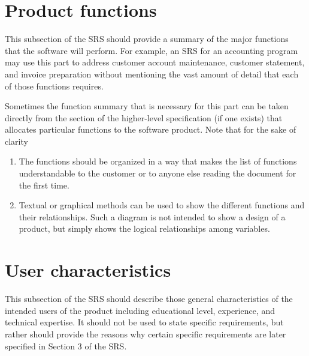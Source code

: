 \documentclass{scrreprt}
\begin{document}
\section{Product functions}
This subsection of the SRS should provide a summary of the major functions that
the software will perform. For example, an SRS for an accounting program may use
this part to address customer account maintenance, customer statement, and
invoice preparation without mentioning the vast amount of detail that each of
those functions requires.\par

Sometimes the function summary that is necessary for this part can be taken
directly from the section of the higher-level specification (if one exists) that
allocates particular functions to the software product. Note that for the sake
of clarity
\begin{enumerate}
	\item The functions should be organized in a way that makes the list of
		functions understandable to the customer or to anyone else reading the
		document for the first time.
	\item Textual or graphical methods can be used to show the different
		functions and their relationships. Such a diagram is not intended to
		show a design of a product, but simply shows the logical relationships
		among variables.
\end{enumerate}

\section{User characteristics}
This subsection of the SRS should describe those general characteristics of the
intended users of the product including educational level, experience, and
technical expertise. It should not be used to state specific requirements, but
rather should provide the reasons why certain specific requirements are later
specified in Section 3 of the SRS.
\end{document}

